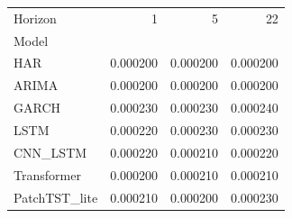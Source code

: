 \begin{tabular}{lrrr}
\toprule
Horizon & 1 & 5 & 22 \\
Model &  &  &  \\
\midrule
HAR & 0.000200 & 0.000200 & 0.000200 \\
ARIMA & 0.000200 & 0.000200 & 0.000200 \\
GARCH & 0.000230 & 0.000230 & 0.000240 \\
LSTM & 0.000220 & 0.000230 & 0.000230 \\
CNN_LSTM & 0.000220 & 0.000210 & 0.000220 \\
Transformer & 0.000200 & 0.000210 & 0.000210 \\
PatchTST_lite & 0.000210 & 0.000200 & 0.000230 \\
\bottomrule
\end{tabular}
